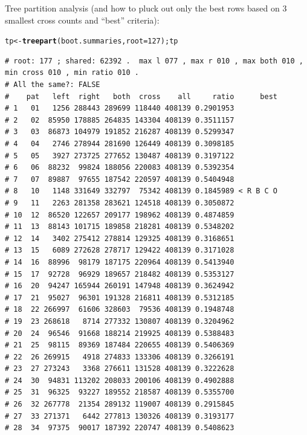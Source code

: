 \documentclass{article}\usepackage[]{graphicx}\usepackage[]{color}
\makeatletter
\newcommand{\hlnum}[1]{\textcolor[rgb]{0.686,0.059,0.569}{#1}}%
\newcommand{\hlstd}[1]{\textcolor[rgb]{0.345,0.345,0.345}{#1}}%
\newcommand{\hlkwb}[1]{\textcolor[rgb]{0.69,0.353,0.396}{#1}}%
\newcommand{\hlkwc}[1]{\textcolor[rgb]{0.333,0.667,0.333}{#1}}%
\newcommand{\hlkwd}[1]{\textcolor[rgb]{0.737,0.353,0.396}{\textbf{#1}}}%
\newenvironment{kframe}{%
 \def\at@end@of@kframe{}%
 \ifinner\ifhmode%
  \def\at@end@of@kframe{\end{minipage}}%
  \begin{minipage}{\columnwidth}%
 \fi\fi%
 \def\FrameCommand##1{\hskip\@totalleftmargin \hskip-\fboxsep
 \colorbox{shadecolor}{##1}\hskip-\fboxsep
     \hskip-\linewidth \hskip-\@totalleftmargin \hskip\columnwidth}%
 \MakeFramed {\advance\hsize-\width
   \@totalleftmargin\z@ \linewidth\hsize
   \@setminipage}}%
 {\par\unskip\endMakeFramed%
 \at@end@of@kframe}
\newenvironment{knitrout}{}{} %
\makeatother
\begin{document}
Tree partition analysis (and how to pluck out only the best rows based on 3 smallest cross counts and ``best'' criteria):

\begin{knitrout}\scriptsize
{}\color{fgcolor}\begin{kframe}
\begin{alltt}
\hlstd{tp} \hlkwb{<-} \hlkwd{treepart}\hlstd{(boot.summaries,}\hlkwc{root}\hlstd{=}\hlnum{127}\hlstd{) ; tp}
\end{alltt}
\begin{verbatim}
# root: 177 ; shared: 62392 .  max l 077 , max r 010 , max both 010 , min cross 010 , min ratio 010 . 
# All the same?: FALSE
#    pat   left  right   both  cross    all     ratio      best
# 1   01   1256 288443 289699 118440 408139 0.2901953          
# 2   02  85950 178885 264835 143304 408139 0.3511157          
# 3   03  86873 104979 191852 216287 408139 0.5299347          
# 4   04   2746 278944 281690 126449 408139 0.3098185          
# 5   05   3927 273725 277652 130487 408139 0.3197122          
# 6   06  88232  99824 188056 220083 408139 0.5392354          
# 7   07  89887  97655 187542 220597 408139 0.5404948          
# 8   10   1148 331649 332797  75342 408139 0.1845989 < R B C O
# 9   11   2263 281358 283621 124518 408139 0.3050872          
# 10  12  86520 122657 209177 198962 408139 0.4874859          
# 11  13  88143 101715 189858 218281 408139 0.5348202          
# 12  14   3402 275412 278814 129325 408139 0.3168651          
# 13  15   6089 272628 278717 129422 408139 0.3171028          
# 14  16  88996  98179 187175 220964 408139 0.5413940          
# 15  17  92728  96929 189657 218482 408139 0.5353127          
# 16  20  94247 165944 260191 147948 408139 0.3624942          
# 17  21  95027  96301 191328 216811 408139 0.5312185          
# 18  22 266997  61606 328603  79536 408139 0.1948748          
# 19  23 268618   8714 277332 130807 408139 0.3204962          
# 20  24  96546  91668 188214 219925 408139 0.5388483          
# 21  25  98115  89369 187484 220655 408139 0.5406369          
# 22  26 269915   4918 274833 133306 408139 0.3266191          
# 23  27 273243   3368 276611 131528 408139 0.3222628          
# 24  30  94831 113202 208033 200106 408139 0.4902888          
# 25  31  96325  93227 189552 218587 408139 0.5355700          
# 26  32 267778  21354 289132 119007 408139 0.2915845          
# 27  33 271371   6442 277813 130326 408139 0.3193177          
# 28  34  97375  90017 187392 220747 408139 0.5408623          

\end{verbatim}
\end{kframe}
\end{knitrout}
\end{document}
